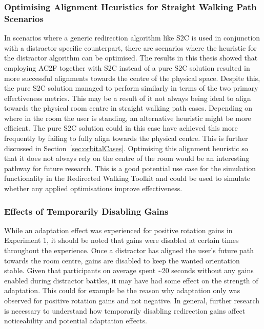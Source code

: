 \subsubsection{Optimising Alignment Heuristics for Straight Walking Path Scenarios}
In scenarios where a generic redirection algorithm like S2C is used in conjunction with a distractor specific counterpart, there are scenarios where the heuristic for the distractor algorithm can be optimised. The results in this thesis showed that employing AC2F together with S2C instead of a pure S2C solution resulted in more successful alignments towards the centre of the physical space. Despite this, the pure S2C solution managed to perform similarly in terms of the two primary effectiveness metrics. This may be a result of it not always being ideal to align towards the physical room centre in straight walking path cases. Depending on where in the room the user is standing, an alternative heuristic might be more efficient. The pure S2C solution could in this case have achieved this more frequently by failing to fully align towards the physical centre. This is further discussed in Section~\ref{sec:orbitalCases}. Optimising this alignment heuristic so that it does not always rely on the centre of the room would be an interesting pathway for future research. This is a good potential use case for the simulation functionality in the Redirected Walking Toolkit and could be used to simulate whether any applied optimisations improve effectiveness. 

\subsubsection{Effects of Temporarily Disabling Gains}
While an adaptation effect was experienced for positive rotation gains in Experiment 1, it should be noted that gains were disabled at certain times throughout the experience. Once a distractor has aligned the user's future path towards the room centre, gains are disabled to keep the wanted orientation stable. Given that participants on average spent \textasciitilde20 seconds without any gains enabled during distractor battles, it may have had some effect on the strength of adaptation. This could for example be the reason why adaptation only was observed for positive rotation gains and not negative. In general, further research is necessary to understand how temporarily disabling redirection gains affect noticeability and potential adaptation effects.

